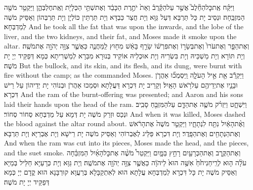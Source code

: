 {וַיִּקַּ֗ח אֶֽת\maqqaf כׇּל\maqqaf הַחֵ֘לֶב֮ אֲשֶׁ֣ר עַל\maqqaf הַקֶּ֒רֶב֒ וְאֵת֙ יֹתֶ֣רֶת הַכָּבֵ֔ד וְאֶת\maqqaf שְׁתֵּ֥י הַכְּלָיֹ֖ת וְאֶֽת\maqqaf חֶלְבְּהֶ֑ן וַיַּקְטֵ֥ר מֹשֶׁ֖ה הַמִּזְבֵּֽחָה׃}
{וּנְסֵיב יָת כָּל תַּרְבָּא דְּעַל גַּוָּא וְיָת חֲצַר כַּבְדָּא וְיָת תַּרְתֵּין כּוֹלְיָן וְיָת תַּרְבְּהוֹן וְאַסֵּיק מֹשֶׁה לְמַדְבְּחָא׃}
{And he took all the fat that was upon the inwards, and the lobe of the liver, and the two kidneys, and their fat, and Moses made it smoke upon the altar.}{}
{וְאֶת\maqqaf הַפָּ֤ר וְאֶת\maqqaf עֹרוֹ֙ וְאֶת\maqqaf בְּשָׂר֣וֹ וְאֶת\maqqaf פִּרְשׁ֔וֹ שָׂרַ֣ף בָּאֵ֔שׁ מִח֖וּץ לַֽמַּחֲנֶ֑ה כַּאֲשֶׁ֛ר צִוָּ֥ה יְהֹוָ֖ה אֶת\maqqaf מֹשֶֽׁה׃}
{וְיָת תּוֹרָא וְיָת מַשְׁכֵּיהּ וְיָת בִּשְׂרֵיהּ וְיָת אוּכְלֵיהּ אוֹקֵיד בְּנוּרָא מִבַּרָא לְמַשְׁרִיתָא כְּמָא דְּפַקֵּיד יְיָ יָת מֹשֶׁה׃}
{But the bullock, and its skin, and its flesh, and its dung, were burnt with fire without the camp; as the \lord\space commanded Moses.}{}
{וַיַּקְרֵ֕ב אֵ֖ת אֵ֣יל הָעֹלָ֑ה וַֽיִּסְמְכ֞וּ אַהֲרֹ֧ן וּבָנָ֛יו אֶת\maqqaf יְדֵיהֶ֖ם עַל\maqqaf רֹ֥אשׁ הָאָֽיִל׃}
{וְקָרֵיב יָת דִּכְרָא דַּעֲלָתָא וּסְמַכוּ אַהֲרֹן וּבְנוֹהִי יָת יְדֵיהוֹן עַל רֵישׁ דִּכְרָא׃}
{And the ram of the burnt-offering was presented; and Aaron and his sons laid their hands upon the head of the ram.}{}
{וַיִּשְׁחָ֑ט וַיִּזְרֹ֨ק מֹשֶׁ֧ה אֶת\maqqaf הַדָּ֛ם עַל\maqqaf הַמִּזְבֵּ֖חַ סָבִֽיב׃}
{וּנְכַס וּזְרַק מֹשֶׁה יָת דְּמָא עַל מַדְבְּחָא סְחוֹר סְחוֹר׃}
{And when it was killed, Moses dashed the blood against the altar round about.}{}
{וְאֶ֨ת\maqqaf הָאַ֔יִל נִתַּ֖ח לִנְתָחָ֑יו וַיַּקְטֵ֤ר מֹשֶׁה֙ אֶת\maqqaf הָרֹ֔אשׁ וְאֶת\maqqaf הַנְּתָחִ֖ים וְאֶת\maqqaf הַפָּֽדֶר׃}
{וְיָת דִּכְרָא פַּלֵּיג לְאֶבְרוֹהִי וְאַסֵּיק מֹשֶׁה יָת רֵישָׁא וְיָת אֶבְרַיָּא וְיָת תַּרְבָּא׃}
{And when the ram was cut into its pieces, Moses made the head, and the pieces, and the suet smoke.}{}
{וְאֶת\maqqaf הַקֶּ֥רֶב וְאֶת\maqqaf הַכְּרָעַ֖יִם רָחַ֣ץ בַּמָּ֑יִם וַיַּקְטֵר֩ מֹשֶׁ֨ה אֶת\maqqaf כׇּל\maqqaf הָאַ֜יִל הַמִּזְבֵּ֗חָה עֹלָ֨ה ה֤וּא לְרֵֽיחַ\maqqaf נִיחֹ֙חַ֙ אִשֶּׁ֥ה הוּא֙ לַיהֹוָ֔ה כַּאֲשֶׁ֛ר צִוָּ֥ה יְהֹוָ֖ה אֶת\maqqaf מֹשֶֽׁה׃}
{וְיָת גַּוָּא וְיָת כְּרָעַיָּא חַלֵּיל בְּמַיָּא וְאַסֵּיק מֹשֶׁה יָת כָּל דִּכְרָא לְמַדְבְּחָא עֲלָתָא הוּא לְאִתְקַבָּלָא בְּרַעֲוָא קוּרְבָּנָא הוּא קֳדָם יְיָ כְּמָא דְּפַקֵּיד יְיָ יָת מֹשֶׁה׃}
